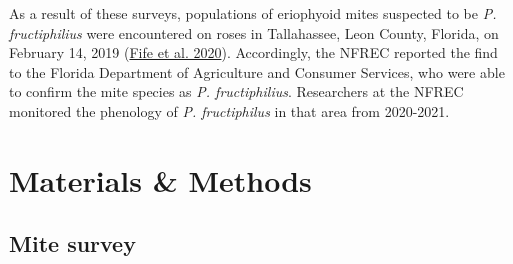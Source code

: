 \documentclass[12pt,final,CPage]{ufthesis}
\begin{document}
{  As a result of these surveys, populations of eriophyoid mites suspected to be \emph{P. fructiphilius} were encountered on roses in Tallahassee, Leon County, Florida, on February 14, 2019 (\protect\hyperlink{ref-Fife2020}{Fife et al. 2020}). Accordingly, the NFREC reported the find to the Florida Department of Agriculture and Consumer Services, who were able to confirm the mite species as \emph{P. fructiphilius}. Researchers at the NFREC monitored the phenology of \emph{P. fructiphilus} in that area from 2020-2021.

  \hypertarget{mm-survey-pheno}{%
  \section{Materials \& Methods}\label{mm-survey-pheno}}

  \hypertarget{mm-survey}{%
  \subsection{Mite survey}\label{mm-survey}}

}
\end{document}
